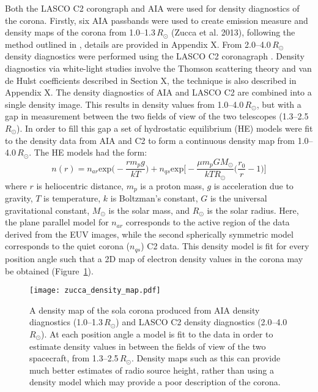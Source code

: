 Both the LASCO C2 corongraph and AIA were used for density diagnostics of the corona. Firstly, six AIA passbands were used to create emission measure and density maps of the corona from 1.0--1.3\,$R_{\odot}$ (Zucca et al. 2013), following the method outlined in \citep{asch2013}, details are provided in Appendix X. From 2.0--4.0\,$R_{\odot}$ density diagnostics were performed using the LASCO C2 coronagraph \citep{van1950}. Density diagnostics via white-light studies involve the Thomson scattering theory and van de Hulst coefficients described in Section X, the technique is also described in Appendix X. The density diagnostics of AIA and LASCO C2 are combined into a single density image. This results in density values from 1.0--4.0\,$R_{\odot}$, but with a gap in measurement between the two fields of view of the two telescopes (1.3--2.5\,$R_{\odot}$). In order to fill this gap a set of hydrostatic equilibrium (HE) models were fit to the density data from AIA and C2 to form a continuous density map from 1.0--4.0\,$R_{\odot}$. The HE models had the form:
\begin{equation}
n(r) = n_{ar}\mathrm{exp}\bigg(-\frac{rm_pg}{kT}\bigg) + n_{qs}\mathrm{exp}\bigg[-\frac{\mu m_pGM_{\odot}}{kTR_{\odot}} \bigg(\frac{r_0}{r}-1\bigg)\bigg]
\end{equation}
where $r$ is heliocentric distance, $m_p$ is a proton mass, $g$ is acceleration due to gravity, $T$ is temperature, $k$ is Boltzman's constant, $G$ is the universal gravitational constant, $M_{\odot}$ is the solar mass, and $R_{\odot}$ is the solar radius. Here, the plane parallel model for $n_{ar}$ corresponds to the active region of the data derived from the EUV images, while the second spherically symmetric model corresponds to the quiet corona ($n_{qs}$) C2 data. This density model is fit for every position angle such that a 2D map of electron density values in the corona may be obtained (Figure~\ref{fig:density_map}).
\begin{figure}[t!]
\begin{center}
\texttt{[image: zucca\_density\_map.pdf]}
\caption[2D density map of the corona]{A density map of the sola corona produced from AIA density diagnostics (1.0--1.3\,$R_{\odot}$) and LASCO C2 density diagnostics (2.0--4.0\,$R_{\odot}$). At each position angle a model is fit to the data in order to estimate density values in between the fields of view of the two spacecraft, from 1.3--2.5\,$R_{\odot}$. Density maps such as this can provide much better estimates of radio source height, rather than using a density model which may provide a poor description of the corona.}
\label{fig:density_map}
\end{center}
\end{figure}


